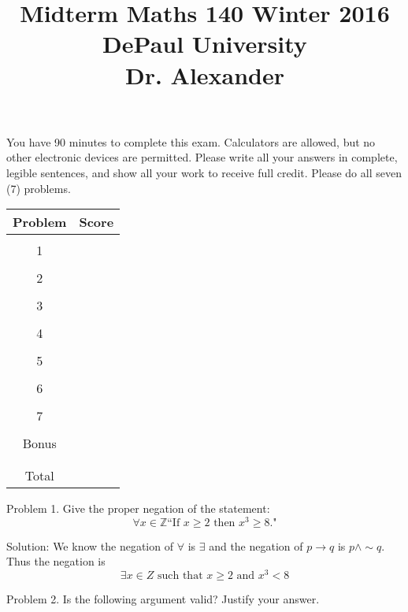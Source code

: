 \documentclass[16 pt]{amsart}
\theoremstyle{definition}
\theoremstyle{remark}
\numberwithin{equation}{subsection}
\newcommand{\Z}{\mathbb{Z}}
\begin{document}
\title{Midterm Maths 140 Winter 2016 \\ DePaul University\\Dr. Alexander}
\maketitle
You have 90 minutes to complete this exam.  Calculators are allowed, but no other electronic devices are permitted.  Please write all your answers in complete, legible sentences, and show all your work to receive full credit.  Please do all seven (7) problems.
\vspace{1in}


\begin{center}
  \begin{tabular}{ c | c }
    Problem & Score\\
    \hline
    &\\
    1&\\
    &\\
    2&\\
    &\\
    3&\\
    &\\
    4&\\
    &\\
    5&\\
    &\\
    6&\\
    &\\
    7&\\
    &\\
    Bonus&\\
    &\\
    \hline 
    &\\    
    Total& 
 \end{tabular}
\end{center}

\newpage 
Problem 1. Give the proper negation of the statement:
\[
\forall x\in\Z \text{``If } x\ge 2 \text{ then } x^3 \ge 8 \text{."}
\]


\vspace{.5in}

Solution: We know the negation of $\forall$ is $\exists$ and the negation of $p\rightarrow q$ is $p \wedge \sim q$.  Thus the negation is
\[
\exists x \in Z \text{ such that } x\ge 2 \text{ and } x^3 <8
\]

\newpage
Problem 2. Is the following argument valid?  Justify your answer.\\
\end{document}
